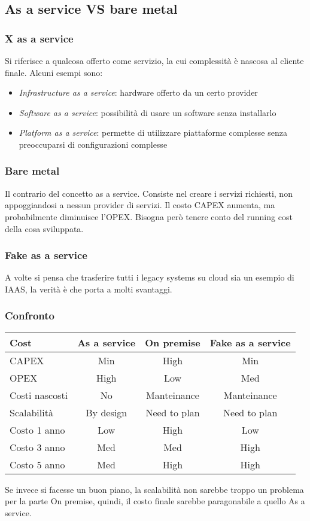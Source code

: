 \subsection{As a service VS bare metal}

\subsubsection{X as a service}
Si riferisce a qualcosa offerto come servizio, la cui complessità è nascosa al 
cliente finale.
Alcuni esempi sono:
\begin{itemize}
    \item \emph{Infrastructure as a service}: hardware offerto da un certo provider
    \item \emph{Software as a service}: possibilità di usare un software senza installarlo
    \item \emph{Platform as a service}: permette di utilizzare piattaforme complesse
    senza preoccuparsi di configurazioni complesse
\end{itemize}

\subsubsection{Bare metal}
Il contrario del concetto as a service. Consiste nel creare i servizi richiesti, 
non appoggiandosi a nessun provider di servizi. 
Il costo CAPEX aumenta, ma probabilmente diminuisce l'OPEX. Bisogna però tenere conto
del running cost della cosa sviluppata.

\subsubsection{Fake as a service}
A volte si pensa che trasferire tutti i legacy systems su cloud sia un esempio di 
IAAS, la verità è che porta a molti svantaggi.

\subsubsection{Confronto}
\begin{center}
    \begin{tabular}{lccc} 
    \toprule
        Cost & As a service & On premise & Fake as a service \\
    \midrule
        CAPEX & Min& High& Min\\ 
        OPEX & High &  Low & Med\\
        Costi nascosti  & No & Manteinance & Manteinance\\
        Scalabilità &  By design & Need to plan & Need to plan\\
        Costo 1 anno &  Low & High & Low\\
        Costo 3 anno &  Med & Med & High\\
        Costo 5 anno &  Med & High & High\\
    \bottomrule
   \end{tabular}
\end{center}
Se invece si facesse un buon piano, la scalabilità non sarebbe troppo un problema per
la parte On premise, quindi, il costo finale sarebbe paragonabile a quello As a service.


